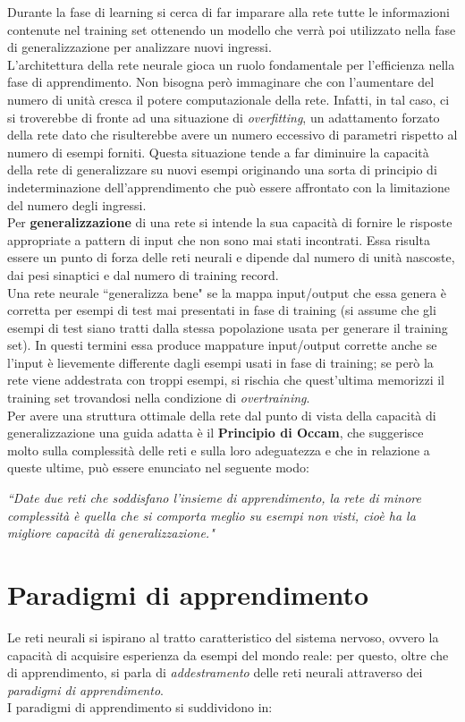 \documentclass[12pt,a4paper,oneside]{book}
\begin{document}
		Durante la fase di learning si cerca di far imparare alla rete tutte le informazioni contenute nel training set ottenendo un modello che verrà poi utilizzato nella fase di generalizzazione per analizzare nuovi ingressi.\\  
		L’architettura della rete neurale gioca un ruolo fondamentale per l’efficienza nella fase di apprendimento. Non bisogna però immaginare che con l'aumentare del numero di unità cresca il potere computazionale della rete. Infatti, in tal caso, ci si troverebbe di fronte ad una situazione di \emph{overfitting}, un adattamento forzato della rete dato che risulterebbe avere un numero eccessivo di parametri rispetto al numero di esempi forniti. Questa situazione tende a far diminuire la capacità della rete di generalizzare su nuovi esempi originando una sorta di principio di indeterminazione dell'apprendimento che può essere affrontato con la limitazione del numero degli ingressi.\\ 
		Per \textbf{generalizzazione} di una rete si intende la sua capacità di fornire le risposte appropriate a pattern di input che non sono mai stati incontrati. Essa risulta essere un punto di forza delle reti neurali e dipende dal numero di unità nascoste, dai pesi sinaptici e dal numero di training record.\\
		Una rete neurale ``generalizza bene" se la mappa input/output che essa genera è corretta per esempi di test mai presentati in fase di training (si assume che gli esempi di test siano tratti dalla stessa popolazione usata per generare il training set). In questi termini essa produce mappature input/output corrette anche se l’input è lievemente differente dagli esempi usati in fase di training; se però la rete viene addestrata con troppi esempi, si rischia che quest'ultima memorizzi il training set trovandosi nella condizione di \emph{overtraining}. \\ 
		Per avere una struttura ottimale della rete dal punto di vista della capacità di generalizzazione una guida adatta è il \textbf{Principio di Occam}, che suggerisce molto sulla complessità delle reti e sulla loro adeguatezza e che in relazione a queste ultime, può essere enunciato nel seguente modo:
		
		\textit{``Date due reti che soddisfano l'insieme di apprendimento, la rete di minore complessità è quella che si comporta meglio su esempi non visti, cioè ha la migliore capacità di generalizzazione."}\\ 
		
		
	\section{Paradigmi di apprendimento}	
		Le reti neurali si ispirano al tratto caratteristico del sistema nervoso, ovvero la capacità di acquisire esperienza da esempi del mondo reale: per questo, oltre che di apprendimento, si parla di \emph{addestramento} delle reti neurali attraverso dei \textit{paradigmi di apprendimento}.\\
		I paradigmi di apprendimento si suddividono in:
		
\end{document}
